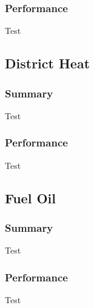 \subsubsection{Performance}
Test

\subsection{District Heat}

\subsubsection{Summary}
Test

\subsubsection{Performance}
Test

\subsection{Fuel Oil}

\subsubsection{Summary}
Test

\subsubsection{Performance}
Test